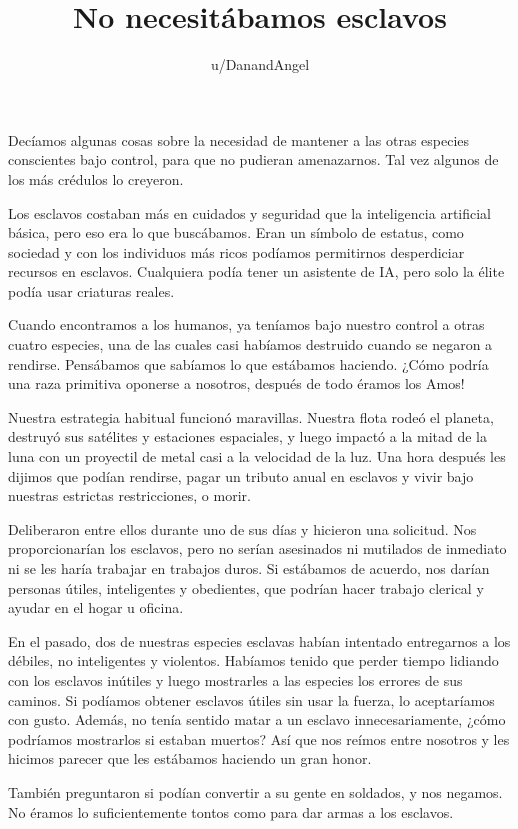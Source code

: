 \documentclass[spanish,12pt,a4paper,oneside,titlepage]{book}
\title{No necesitábamos esclavos}
\author{u/DanandAngel}
\begin{document}
    \maketitle

    Decíamos algunas cosas sobre la necesidad de mantener a las otras especies conscientes bajo control, para que no pudieran amenazarnos. Tal vez algunos de los más crédulos lo creyeron.

    Los esclavos costaban más en cuidados y seguridad que la inteligencia artificial básica, pero eso era lo que buscábamos. Eran un símbolo de estatus, como sociedad y con los individuos más ricos podíamos permitirnos desperdiciar recursos en esclavos. Cualquiera podía tener un asistente de IA, pero solo la élite podía usar criaturas reales.

    Cuando encontramos a los humanos, ya teníamos bajo nuestro control a otras cuatro especies, una de las cuales casi habíamos destruido cuando se negaron a rendirse. Pensábamos que sabíamos lo que estábamos haciendo. ¿Cómo podría una raza primitiva oponerse a nosotros, después de todo éramos los Amos!

    Nuestra estrategia habitual funcionó maravillas. Nuestra flota rodeó el planeta, destruyó sus satélites y estaciones espaciales, y luego impactó a la mitad de la luna con un proyectil de metal casi a la velocidad de la luz. Una hora después les dijimos que podían rendirse, pagar un tributo anual en esclavos y vivir bajo nuestras estrictas restricciones, o morir.

    Deliberaron entre ellos durante uno de sus días y hicieron una solicitud. Nos proporcionarían los esclavos, pero no serían asesinados ni mutilados de inmediato ni se les haría trabajar en trabajos duros. Si estábamos de acuerdo, nos darían personas útiles, inteligentes y obedientes, que podrían hacer trabajo clerical y ayudar en el hogar u oficina.

    En el pasado, dos de nuestras especies esclavas habían intentado entregarnos a los débiles, no inteligentes y violentos. Habíamos tenido que perder tiempo lidiando con los esclavos inútiles y luego mostrarles a las especies los errores de sus caminos. Si podíamos obtener esclavos útiles sin usar la fuerza, lo aceptaríamos con gusto. Además, no tenía sentido matar a un esclavo innecesariamente, ¿cómo podríamos mostrarlos si estaban muertos? Así que nos reímos entre nosotros y les hicimos parecer que les estábamos haciendo un gran honor.

    También preguntaron si podían convertir a su gente en soldados, y nos negamos. No éramos lo suficientemente tontos como para dar armas a los esclavos.
\end{document}
